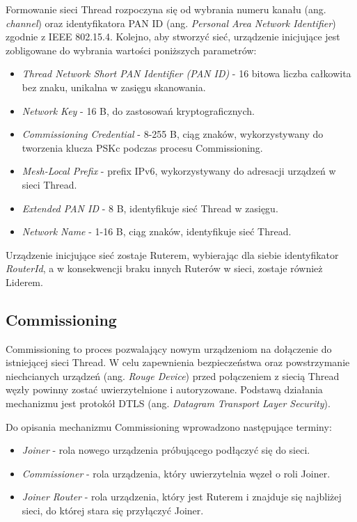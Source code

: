     Formowanie sieci Thread rozpoczyna się od wybrania numeru kanału (ang. \textit{channel}) oraz identyfikatora PAN ID (ang. \textit{Personal Area Network Identifier}) zgodnie z IEEE 802.15.4. Kolejno, aby stworzyć sieć, urządzenie inicjujące jest zobligowane do wybrania wartości poniższych parametrów:
    \begin{itemize}
        \item \textit{Thread Network Short PAN Identifier (PAN ID)} - 16 bitowa liczba całkowita bez znaku, unikalna w zasięgu skanowania.
        \item \textit{Network Key} - 16 B, do zastosowań kryptograficznych.
        \item \textit{Commissioning Credential} - 8-255 B, ciąg znaków, wykorzystywany do tworzenia klucza PSKc podczas procesu Commissioning.
        \item \textit{Mesh-Local Prefix} - prefix IPv6, wykorzystywany do adresacji urządzeń w sieci Thread.
        \item \textit{Extended PAN ID} - 8 B, identyfikuje sieć Thread w zasięgu.
        \item \textit{Network Name} - 1-16 B, ciąg znaków, identyfikuje sieć Thread.
    \end{itemize}{}

    Urządzenie inicjujące sieć zostaje Ruterem, wybierając dla siebie identyfikator \textit{RouterId}, a w konsekwencji braku innych Ruterów w sieci, zostaje również Liderem.

    \subsection{Commissioning}
    \label{subsec:commissioning}

    Commissioning to proces pozwalający nowym urządzeniom na dołączenie do istniejącej sieci Thread. W celu zapewnienia bezpieczeństwa oraz powstrzymanie niechcianych urządzeń (ang. \textit{Rouge Device}) przed połączeniem z siecią Thread węzły powinny zostać uwierzytelnione i autoryzowane. Podstawą działania mechanizmu jest protokół DTLS (ang. \textit{Datagram Transport Layer Security}).

    Do opisania mechanizmu Commissioning wprowadzono następujące terminy:
    \begin{itemize}
        \item \textit{Joiner} - rola nowego urządzenia próbującego podłączyć się do sieci.
        \item \textit{Commissioner} - rola urządzenia, który uwierzytelnia węzeł o roli Joiner.
        \item \textit{Joiner Router} - rola urządzenia, który jest Ruterem i znajduje się najbliżej sieci, do której stara się przyłączyć Joiner.
    \end{itemize}

